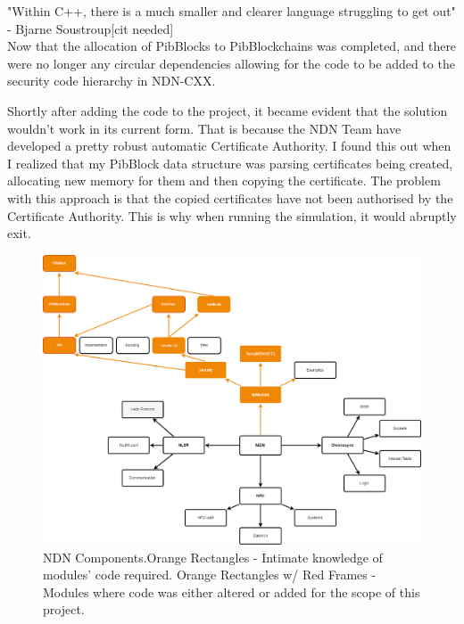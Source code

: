 "Within C++, there is a much smaller and clearer language struggling to get out" - Bjarne Soustroup[cit needed]
\\


Now that the allocation of PibBlocks to PibBlockchains was completed, and there were no longer any circular dependencies allowing for the code to be added to the security code hierarchy in NDN-CXX. \par 

Shortly after adding the code to the project, it became evident that the solution wouldn't work in its current form. That is because the NDN Team have developed a pretty robust automatic Certificate Authority. I found this out when I realized that my PibBlock data structure was parsing certificates being created, allocating new memory for them and then copying the certificate. The problem with this approach is that the copied certificates have not been authorised by the Certificate Authority. This is why when running the simulation, it would abruptly exit. 


\begin{figure}
\includegraphics[width=6in]{NDN.png}
\caption{
NDN Components.Orange Rectangles - Intimate knowledge of modules' code required. Orange Rectangles w/ Red Frames - Modules where code was either altered or added for the scope of this project.}
\end{figure}